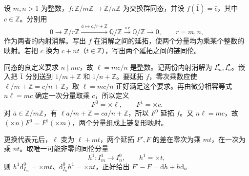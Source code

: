 \begin{exercise}\label{b4:ex:07-cyclic-injective-comparison}
	设 \(m,n>1\) 为整数，\(f:\mathbb Z/m\mathbb Z\to\mathbb Z/n\mathbb Z\) 为交换群同态，并设 \(f(\bar1)=\bar c\)，其中 \(c\in\mathbb Z\)。分别用
	\[
		0\longrightarrow\mathbb Z/r\mathbb Z \xrightarrow{\bar a\mapsto a/r+\mathbb Z}\mathbb Q/\mathbb Z \xrightarrow{\times r}\mathbb Q/\mathbb Z\longrightarrow0, \qquad r=m,n,
	\]
	作为两者的内射消解。写出 \(f\) 在消解之间的延拓，使两个分量均为乘某个整数的映射。若把 \(c\) 换为 \(c+nt\)（\(t\in\mathbb Z\)），写出两个延拓之间的链同伦。
\end{exercise}
\begin{solution}
	同态的良定义要求 \(n\mid mc\)，故 \(\ell=mc/n\) 是整数。记两份内射消解为 \(I_m^\bullet,I_n^\bullet\)。嵌入把 \(\bar1\) 分别送到 \(1/m+\mathbb Z\) 和 \(1/n+\mathbb Z\)。要延拓 \(f\)，零次乘数应使 \(\ell/m+\mathbb Z=c/n+\mathbb Z\)，取 \(\ell=mc/n\) 正好满足这个要求。再由微分相容等式 \(n\ell=mc\) 确定一次分量取乘 \(c\)，所以定义
	\[
		F^0=\times\ell,\qquad F^1=\times c.
	\]
	对 \(\bar a\in\mathbb Z/m\mathbb Z\)，有 \(\ell a/m+\mathbb Z=ca/n+\mathbb Z\)，所以 \(F^0\) 延拓 \(f\)。又 \(n\ell=mc\)，故 \((\times n)F^0=F^1(\times m)\)，两个分量组成上链复形映射。

	更换代表元后，\(\ell\) 变为 \(\ell+mt\)，两个延拓 \(F',F\) 的差在零次为乘 \(mt\)，在一次为乘 \(nt\)。取唯一可能非零的同伦分量
	\[
		h^1:I_m^1\longrightarrow I_n^0,\qquad h^1=\times t,
	\]
	则 \(h^1\mathrm d_{I_m}^0=\times mt\)、\(\mathrm d_{I_n}^0h^1=\times nt\)，正好给出 \(F'-F=\mathrm dh+h\mathrm d\)。
\end{solution}
